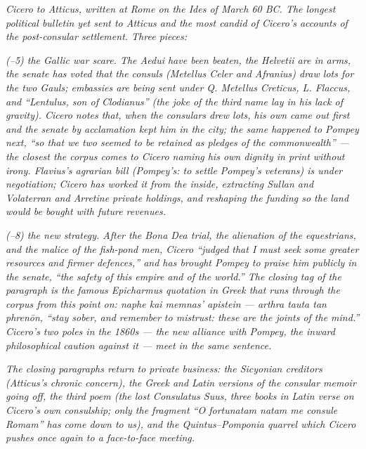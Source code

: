 
\textit{Cicero to Atticus, written at Rome on the Ides of
March 60 BC. The longest political bulletin yet sent to
Atticus and the most candid of Cicero's accounts of the
post-consular settlement. Three pieces:}

\textit{(--5) the Gallic war scare. The Aedui
have been beaten, the Helvetii are in arms, the senate has
voted that the consuls (Metellus Celer and Afranius) draw
lots for the two Gauls; embassies are being sent under
Q. Metellus Creticus, L. Flaccus, and ``Lentulus, son of
Clodianus'' (the joke of the third name lay in his lack of
gravity). Cicero notes that, when the consulars drew lots,
his own came out first and the senate by acclamation kept
him in the city; the same happened to Pompey next, ``so
that we two seemed to be retained as pledges of the
commonwealth'' --- the closest the corpus comes to Cicero
naming his own dignity in print without irony. Flavius's
agrarian bill (Pompey's: to settle Pompey's veterans) is
under negotiation; Cicero has worked it from the inside,
extracting Sullan and Volaterran and Arretine private
holdings, and reshaping the funding so the land would be
bought with future revenues.}

\textit{(--8) the new strategy. After the
Bona Dea trial, the alienation of the equestrians, and the
malice of the fish-pond men, Cicero ``judged that I must
seek some greater resources and firmer defences,'' and has
brought Pompey to praise him publicly in the senate, ``the
safety of this empire and of the world.'' The closing tag
of the paragraph is the famous Epicharmus quotation in
Greek that runs through the corpus from this point on:
\textit{naphe kai memnas' apistein --- arthra tauta tan
phren\=on}, ``stay sober, and remember to mistrust: these
are the joints of the mind.'' Cicero's two poles in the
1860s --- the new alliance with Pompey, the inward
philosophical caution against it --- meet in the same
sentence.}

\textit{The closing paragraphs return to private business:
the Sicyonian creditors (Atticus's chronic concern), the
Greek and Latin versions of the consular memoir going off,
the third poem (the lost \textit{Consulatus Suus}, three
books in Latin verse on Cicero's own consulship; only the
fragment ``O fortunatam natam me consule Romam'' has come
down to us), and the Quintus--Pomponia quarrel which
Cicero pushes once again to a face-to-face meeting.}
